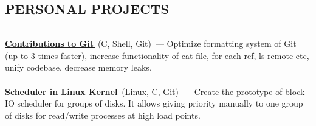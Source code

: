 \documentclass[11pt]{res} %
\let\orighref\href
\renewcommand{\href}[2]{\orighref{#1}{#2\,\faExternalLink}}
\begin{document}
 
 

\address{April 2019 \\ Saint Petersburg, Russia}

\address{\href{mailto:olyatelezhnaya@gmail.com}{olyatelezhnaya@gmail.com} \\
\href{https://github.com/telezhnaya}{github.com/telezhnaya} \\ +7 905 287 27 73}
                                             
\begin{resume}


\section{\uppercase{Personal Projects}}
\begin{spacing}{0.3}
\textcolor[RGB]{220,220,220}{\rule{\linewidth}{0.4pt}} 
\end{spacing}
\textbf{\href{https://github.com/git/git/commits?author=telezhnaya}{Contributions to Git}} (C, Shell, Git)~--- Optimize formatting system of Git (up to 3 times faster), increase functionality of cat-file, for-each-ref, ls-remote etc, unify codebase, decrease memory leaks. \\ \\
\textbf{\href{https://github.com/telezhnaya/linux}{Scheduler in Linux Kernel}} (Linux, C, Git)~--- Create the prototype of block IO scheduler for groups of disks. It allows giving priority manually to one group of disks for read/write processes at high load points.


\end{resume}
\end{document}

